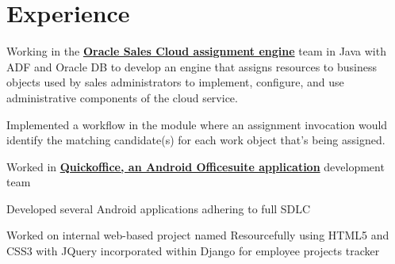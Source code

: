 \documentclass[a4paper]{srika-resume} %
\begin{document}
\begin{minipage}[t]{0.64\textwidth} %


\section{Experience}


\vspace{\topsep} %
\begin{tightitemize}
\item Working in the \textbf{\href{https://docs.oracle.com/cloud/latest/salescs_gs/OASAL/OASAL1439686.htm\#OASAL1439686}{Oracle Sales Cloud assignment engine}} team in Java with ADF and Oracle DB to develop an engine that assigns resources to business objects used by sales administrators to implement, configure, and use administrative components of the cloud service.
\item Implemented a workflow in the module where an assignment invocation would identify the matching candidate(s) for each work object that's being assigned.
\end{tightitemize}

\sectionspace %



\begin{tightitemize}
\item Worked in \textbf{\href{https://en.wikipedia.org/wiki/Quickoffice}{Quickoffice, an Android Officesuite application}} development team
\item Developed several Android applications adhering to full SDLC
\item Worked on internal web-based project named Resourcefully using HTML5 and CSS3 with JQuery incorporated within Django for employee projects tracker
\end{tightitemize}

\sectionspace %


\end{minipage}
\end{document}
